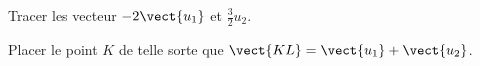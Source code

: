 
\begin{exercice}\label{exosmath-0689}

    Tracer les vecteur \( -2\vect{ u_1 }\) et \( \frac{ 3 }{ 2 }u_{2}\).

\begin{center}
   
\end{center}
Placer le point \( K\) de telle sorte que \( \vect{ KL }=\vect{ u_1 }+\vect{ u_2 }\).

\end{exercice}
